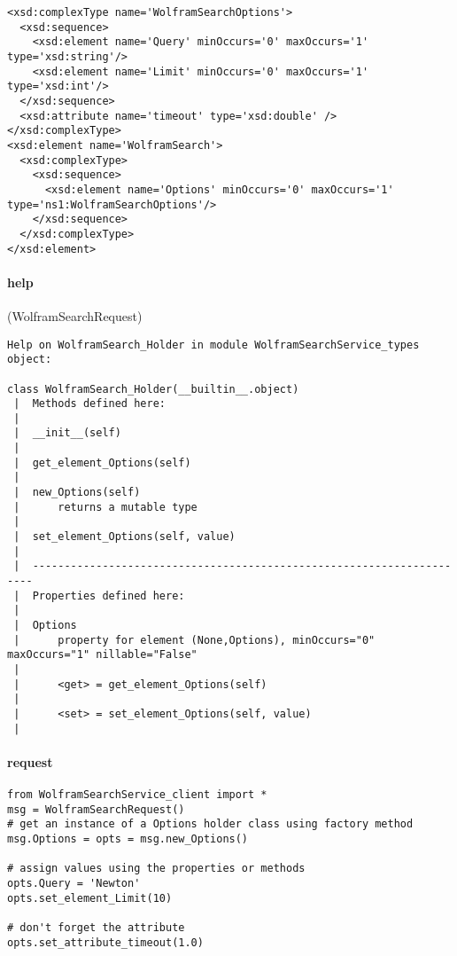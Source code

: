 \begin{verbatim}
<xsd:complexType name='WolframSearchOptions'>
  <xsd:sequence>
    <xsd:element name='Query' minOccurs='0' maxOccurs='1' type='xsd:string'/>
    <xsd:element name='Limit' minOccurs='0' maxOccurs='1' type='xsd:int'/>
  </xsd:sequence>
  <xsd:attribute name='timeout' type='xsd:double' />
</xsd:complexType>
<xsd:element name='WolframSearch'>
  <xsd:complexType>
    <xsd:sequence>
      <xsd:element name='Options' minOccurs='0' maxOccurs='1' type='ns1:WolframSearchOptions'/>
    </xsd:sequence>
  </xsd:complexType>
</xsd:element>
\end{verbatim}
\par

\paragraph{help}(WolframSearchRequest)
\begin{verbatim}
Help on WolframSearch_Holder in module WolframSearchService_types object:

class WolframSearch_Holder(__builtin__.object)
 |  Methods defined here:
 |
 |  __init__(self)
 |
 |  get_element_Options(self)
 |
 |  new_Options(self)
 |      returns a mutable type
 |
 |  set_element_Options(self, value)
 |
 |  ----------------------------------------------------------------------
 |  Properties defined here:
 |
 |  Options
 |      property for element (None,Options), minOccurs="0" maxOccurs="1" nillable="False"
 |
 |      <get> = get_element_Options(self)
 |
 |      <set> = set_element_Options(self, value)
 |
\end{verbatim}
\par

\paragraph{request}
\begin{verbatim}
from WolframSearchService_client import *
msg = WolframSearchRequest()
# get an instance of a Options holder class using factory method
msg.Options = opts = msg.new_Options()

# assign values using the properties or methods
opts.Query = 'Newton'
opts.set_element_Limit(10)

# don't forget the attribute
opts.set_attribute_timeout(1.0)

\end{verbatim}
\par

